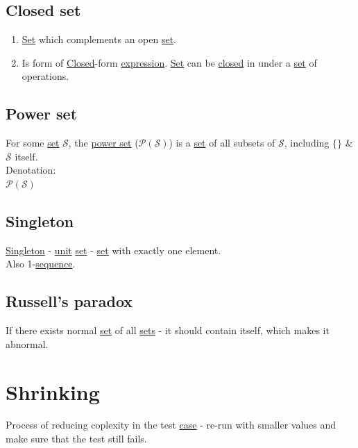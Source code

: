 \documentclass[a4paper,14pt,oneside]{book}
\begin{document}
\section{\label{org3ee36ae}Closed set}
\label{sec:org07e6595}
\begin{enumerate}
\item \hyperref[orge119629]{Set} which complements an open \hyperref[orge119629]{set}.\\

\item Is form of \hyperref[orgcda5e16]{Closed}-form \hyperref[org6aa6989]{expression}. \hyperref[orge119629]{Set} can be \hyperref[orgcda5e16]{closed} in under a \hyperref[orge119629]{set} of operations.\\
\end{enumerate}

\section{\label{orgcca4cfd}Power set}
\label{sec:org8fbdcc3}
For some \hyperref[orge119629]{set} \(\mathcal{S}\), the \hyperref[orgcca4cfd]{power set} (\(\mathcal{P(S)}\)) is a \hyperref[orge119629]{set} of all subsets of \(\mathcal{S}\), including \(\{\}\) \& \(\mathcal{S}\) itself.\\

Denotation:\\
\(\mathcal{P(S)}\)\\

\section{\label{org9a003be}Singleton}
\label{sec:org1c93ffc}
\hyperref[org9a003be]{Singleton} - \hyperref[orgea7ee99]{unit} \hyperref[orge119629]{set} - \hyperref[orge119629]{set} with exactly one element.\\
Also 1-\hyperref[org49f8153]{sequence}.\\

\section{\label{orgde95b3c}Russell's paradox}
\label{sec:org9de79cd}
If there exists normal \hyperref[orge119629]{set} of all \hyperref[org1faae0f]{sets} - it should contain itself, which makes it abnormal.\\

\chapter{\label{org5b8f43e}Shrinking}
\label{sec:org51a636e}
Process of reducing coplexity in the test \hyperref[orge2ba09c]{case} - re-run with smaller values and make sure that the test still fails.\\
\end{document}
